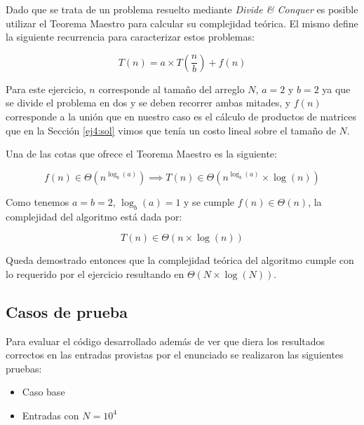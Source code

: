 Dado que se trata de un problema resuelto mediante \emph{Divide \& Conquer} es
posible utilizar el Teorema Maestro para calcular su complejidad teórica. El
mismo define la siguiente recurrencia para caracterizar estos problemas:

\begin{equation*}
	T\left(n\right) = a \times T\left(\frac{n}{b}\right) + f\left(n\right)
\end{equation*}

Para este ejercicio, $n$ corresponde al tamaño del arreglo $N$, $a = 2$ y $b = 2$ ya que se divide el problema en dos y se
deben recorrer ambas mitades, y $f\left(n\right)$ corresponde a la unión que en
nuestro caso es el cálculo de productos de matrices que en la Sección
\ref{ej4:sol} vimos que tenía un costo lineal sobre el tamaño de $N$.

Una de las cotas que ofrece el Teorema Maestro es la siguiente:

\begin{equation*}
	f\left(n\right) \in \Theta\left(n^{\log_b\left(a\right)}\right)
	\implies T\left(n\right) \in \Theta\left(n^{\log_b\left(a\right)} \times
	\log\left(n\right)\right)
\end{equation*}

Como tenemos $a = b = 2$, $\log_b\left(a\right) = 1$ y se cumple
$f\left(n\right) \in \Theta\left(n\right)$, la complejidad del
algoritmo está dada por:

\begin{equation*}
	T\left(n\right) \in \Theta\left(n \times \log\left(n\right)\right)
\end{equation*}

Queda demostrado entonces que la complejidad teórica del algoritmo cumple con lo
requerido por el ejercicio resultando en $\Theta\left(N \times
\log\left(N\right)\right)$.

\subsection{Casos de prueba}

Para evaluar el código desarrollado además de ver que diera los resultados
correctos en las entradas provistas por el enunciado se realizaron las
siguientes pruebas:

\begin{itemize}
	\item{Caso base}
	\item{Entradas con $N = 10^4$}
\end{itemize}

